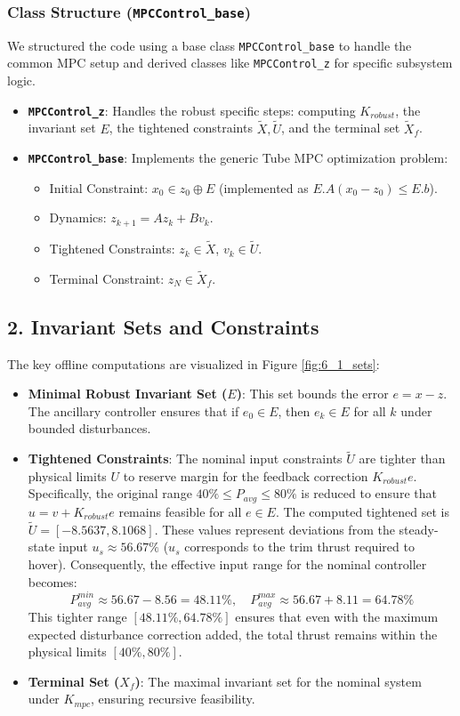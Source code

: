 \documentclass{article}
\begin{document}
\subsubsection*{Class Structure (\texttt{MPCControl\_base})}

We structured the code using a base class \texttt{MPCControl\_base} to handle the common MPC setup and derived classes like \texttt{MPCControl\_z} for specific subsystem logic.
\begin{itemize}
    \item \textbf{\texttt{MPCControl\_z}}: Handles the robust specific steps: computing $K_{robust}$, the invariant set $E$, the tightened constraints $\tilde{X}, \tilde{U}$, and the terminal set $\tilde{X}_f$.
    \item \textbf{\texttt{MPCControl\_base}}: Implements the generic Tube MPC optimization problem:
    \begin{itemize}
        \item Initial Constraint: $x_0 \in z_0 \oplus E$ (implemented as $E.A(x_0 - z_0) \le E.b$).
        \item Dynamics: $z_{k+1} = A z_k + B v_k$.
        \item Tightened Constraints: $z_k \in \tilde{X}$, $v_k \in \tilde{U}$.
        \item Terminal Constraint: $z_N \in \tilde{X}_f$.
    \end{itemize}
\end{itemize}

\subsection*{2. Invariant Sets and Constraints}

The key offline computations are visualized in Figure \ref{fig:6_1_sets}:
\begin{itemize}
    \item \textbf{Minimal Robust Invariant Set ($E$)}: This set bounds the error $e = x - z$. The ancillary controller ensures that if $e_0 \in E$, then $e_k \in E$ for all $k$ under bounded disturbances.
    \item \textbf{Tightened Constraints}: The nominal input constraints $\tilde{U}$ are tighter than physical limits $U$ to reserve margin for the feedback correction $K_{robust}e$.
    Specifically, the original range $40\% \le P_{avg} \le 80\%$ is reduced to ensure that $u = v + K_{robust}e$ remains feasible for all $e \in E$.
    The computed tightened set is $\tilde{U} = [-8.5637, 8.1068]$. These values represent deviations from the steady-state input $u_s \approx 56.67\%$ ($u_s$ corresponds to the trim thrust required to hover).
    Consequently, the effective input range for the nominal controller becomes:
    \[ P_{avg}^{min} \approx 56.67 - 8.56 = 48.11\%, \quad P_{avg}^{max} \approx 56.67 + 8.11 = 64.78\% \]
    This tighter range $[48.11\%, 64.78\%]$ ensures that even with the maximum expected disturbance correction added, the total thrust remains within the physical limits $[40\%, 80\%]$.
    \item \textbf{Terminal Set ($X_f$)}: The maximal invariant set for the nominal system under $K_{mpc}$, ensuring recursive feasibility.
\end{itemize}
\end{document}
